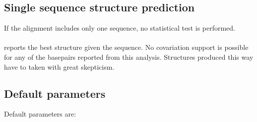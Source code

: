  \subsection{Single sequence structure prediction}

 If the alignment includes only one sequence, no statistical test is performed. \\

 \noindent
 \\
%
 reports the best structure given the sequence. No covariation support
 is possible for any of the basepairs reported from this
 analysis. Structures produced this way have to taken with great
 skepticism. 

 \subsection{Default parameters}

Default parameters are:

